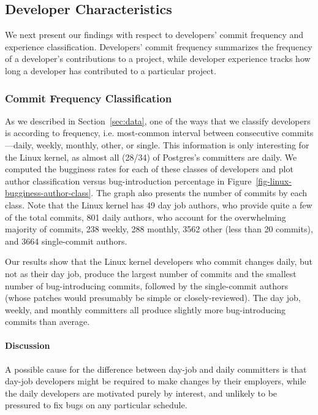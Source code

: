 \subsection{Developer Characteristics}
\label{sec-dev-char}
We next present our findings with respect to developers' commit
frequency and experience classification. Developers'
commit frequency summarizes the frequency of
a developer's contributions to a project, while developer experience
tracks how long a developer has contributed to a particular project.

\subsubsection{Commit Frequency Classification} 
As we described in Section~\ref{sec:data}, one of the ways that we
classify developers is according to frequency, i.e. most-common
interval between consecutive commits---daily, weekly, monthly, other,
or single.  This information is only interesting for the Linux kernel,
as almost all (28/34) of Postgres's committers are daily. We computed
the bugginess rates for each of these classes of developers and plot
author classification versus bug-introduction percentage in
Figure~\ref{fig-linux-bugginess-author-class}. The graph also presents
the number of commits by each class. Note that the Linux kernel has 49
day job authors, who provide quite a few of the total commits, 801 daily authors, who account for the overwhelming majority of commits, 238
weekly, 288 monthly, 3562 other (less than 20 commits), 
and 3664 single-commit authors.

Our results show that the Linux kernel developers who commit changes daily, but
not as their day job, produce the largest number of commits and the
smallest number of bug-introducing
commits, followed by the single-commit authors (whose patches would
presumably be simple or closely-reviewed). The day job, weekly, and
monthly committers all produce slightly more bug-introducing commits
than average.

\paragraph{Discussion}
A possible cause for the difference between day-job and daily
committers is that day-job developers might be required to make
changes by their employers, while the daily developers are motivated
purely by interest, and unlikely to be pressured to fix bugs on any
particular schedule.

